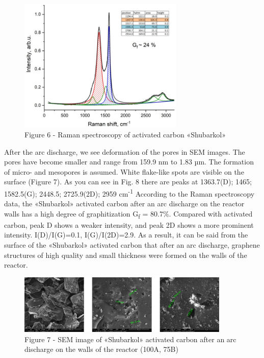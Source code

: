 \begin{figure}[H]
	\centering
	\includegraphics[width=0.7\textwidth]{assets/58}
	\caption*{Figure 6 - Raman spectroscopy of activated carbon «Shubarkol»}
\end{figure}

\begin{multicols}{2}
After the arc discharge, we see deformation of the pores in SEM images.
The pores have become smaller and range from 159.9 nm to 1.83 µm. The
formation of micro- and mesopores is assumed. White flake-like spots are
visible on the surface (Figure 7). As you can see in Fig. 8 there are
peaks at 1363.7(D); 1465; 1582.5(G); 2448.5; 2725.9(2D); 2959
cm\textsuperscript{-1} According to the Raman spectroscopy data, the
«Shubarkol» activated carbon after an arc discharge on the reactor walls
has a high degree of graphitization G\textsubscript{f} = 80.7\%.
Compared with activated carbon, peak D shows a weaker intensity, and
peak 2D shows a more prominent intensity. I(D)/I(G)=0.1, I(G)/I(2D)=2.9.
As a result, it can be said from the surface of the «Shubarkol»
activated carbon that after an arc discharge, graphene structures of
high quality and small thickness were formed on the walls of the
reactor.
\end{multicols}

\begin{figure}[H]
	\centering
	\includegraphics[width=0.9\textwidth]{assets/59}
	\caption*{Figure 7 - SEM image of «Shubarkol» activated carbon after an arc discharge on the walls of the reactor (100A, 75B)}
\end{figure}

